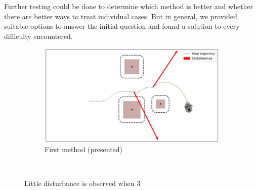 \documentclass[conference]{IEEEtran}
\begin{document}
Further testing could be done to determine which method is better and whether there are better ways to treat individual cases. But in general, we provided suitable options to answer the initial question and found a solution to every difficulty encountered.


\begin{figure}
\centering
\begin{subfigure}{1\columnwidth}
\centerline{\includegraphics[width=\textwidth]{figures/first_meth.png}}
  \caption{First method (presented)}
\end{subfigure}\\



\caption{Little disturbance is observed when 3}
\label{fig_all_3_meth}
\end{figure}




\end{document}
